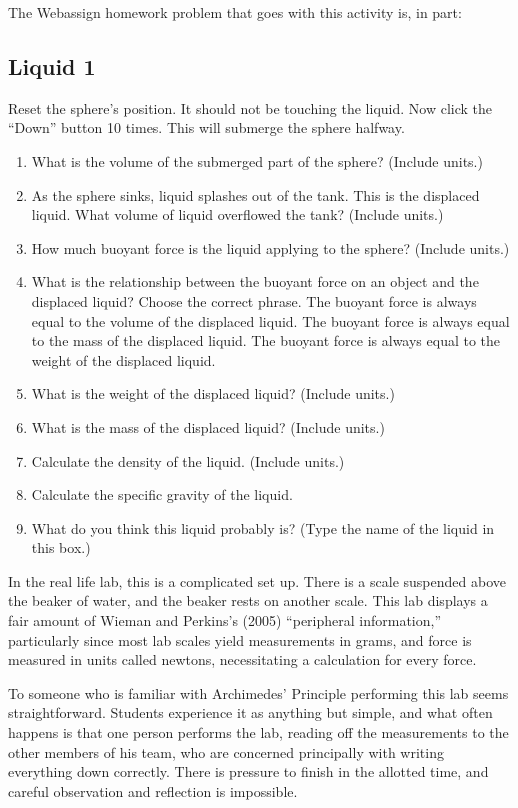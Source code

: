\documentclass[11.5pt]{sig-alternate} %
\begin{document}
\begin{large}
The Webassign homework problem that goes with this activity is, in part:

\subsection*{Liquid 1}
Reset the sphere’s position. It should not be touching the liquid. Now click the “Down” button 10 times. This will submerge the sphere halfway.

\begin{enumerate}[label=\alph*)]
    \item What is the volume of the submerged part of the sphere? (Include units.)
    \item As the sphere sinks, liquid splashes out of the tank. This is the displaced liquid. What volume of liquid overflowed the tank? (Include units.)
    \item  How much buoyant force is the liquid applying to the sphere? (Include units.)
    \item  What is the relationship between the buoyant force on an object and the displaced liquid? Choose the correct phrase. The buoyant force is always equal to the volume of the displaced liquid. The buoyant force is always equal to the mass of the displaced liquid. The buoyant force is always equal to the weight of the displaced liquid.
    \item  What is the weight of the displaced liquid? (Include units.)
    \item  What is the mass of the displaced liquid? (Include units.)
    \item  Calculate the density of the liquid. (Include units.)
    \item  Calculate the specific gravity of the liquid.
    \item  What do you think this liquid probably is? (Type the name of the liquid in this box.)
\end{enumerate}

In the real life lab, this is a complicated set up. There is a scale suspended above the beaker of water, and the beaker rests on another scale. This lab displays a fair amount of Wieman and Perkins’s (2005) “peripheral information,” particularly since most lab scales yield measurements in grams, and force is measured in units called newtons, necessitating a calculation for every force.

To someone who is familiar with Archimedes’ Principle performing this lab seems straightforward. Students experience it as anything but simple, and what often happens is that one person performs the lab, reading off the measurements to the other members of his team, who are concerned principally with writing everything down correctly. There is pressure to finish in the allotted time, and careful observation and reflection is impossible.


\end{large}
\end{document}
